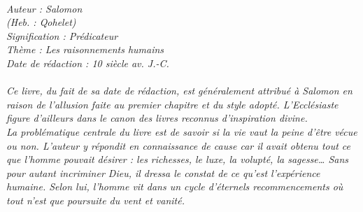 \BFont
\noindent\hrulefill
{\footnotesize
\textit{
\bigskip
{\centering{}
\\Auteur : Salomon
\\(Heb. : Qohelet)
\\Signification : Prédicateur
\\Thème : Les raisonnements humains
\\Date de rédaction : 10 siècle av. J.-C.\\}
}
\textit{
\\Ce livre, du fait de sa date de rédaction, est généralement attribué à Salomon en raison de l'allusion faite au premier chapitre et du style adopté. L'Ecclésiaste figure d'ailleurs dans le canon des livres reconnus d'inspiration divine.
\\La problématique centrale du livre est de savoir si la vie vaut la peine d'être vécue ou non. L'auteur y répondit en connaissance de cause car il avait obtenu tout ce que l'homme pouvait désirer : les richesses, le luxe, la volupté, la sagesse… Sans pour autant incriminer Dieu, il dressa le constat de ce qu'est l'expérience humaine. Selon lui, l'homme vit dans un cycle d'éternels recommencements où tout n'est que poursuite du vent et vanité. 
}
}
\par\nobreak\noindent\hrulefill

